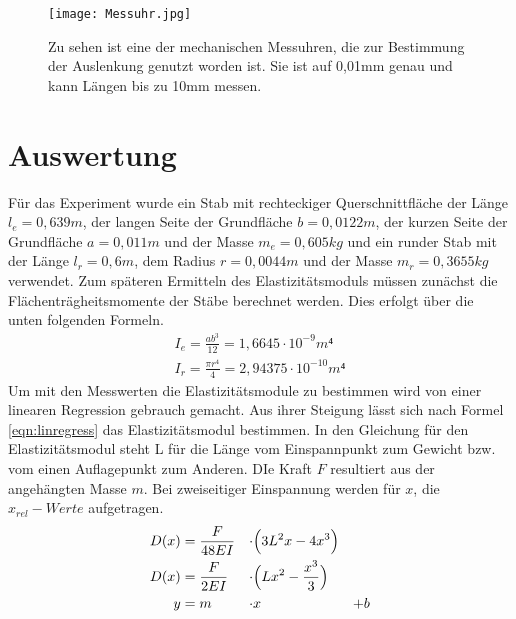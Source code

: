 \documentclass[titlepage = firstcover]{scrartcl}
\begin{document}
      \begin{figure}[h]
        \centering
        \texttt{[image: Messuhr.jpg]}
        \caption{Zu sehen ist eine der mechanischen Messuhren, die zur Bestimmung der Auslenkung genutzt worden ist. Sie ist auf 0,01mm genau und kann Längen bis zu 10mm messen.}
        \label{fig:fotoUhr}
      \end{figure}   
      
      \FloatBarrier

    \newpage

    \section{Auswertung}
      Für das Experiment wurde ein Stab mit rechteckiger Querschnittfläche der Länge $l_e = 0,639 m$, der langen Seite der Grundfläche $b = 0,0122 m$, der kurzen Seite der
      Grundfläche $a = 0,011 m$ und der Masse $m_e = 0,605 kg$ und ein runder Stab mit der Länge $l_r = 0,6 m$, dem Radius $r = 0,0044 m$ und der Masse $m_r = 0,3655 kg$ verwendet. Zum späteren 
      Ermitteln des Elastizitätsmoduls müssen zunächst die Flächenträgheitsmomente der Stäbe berechnet werden. Dies erfolgt über die unten folgenden Formeln.
      \begin{gather}
        I_e = \frac{ab^3}{12} = 1,6645 \cdot 10^{-9} m⁴\\
        I_r = \frac{\pi r^4}{4} = 2,94375 \cdot 10^{-10} m⁴
        \label{eqn:Flächenträg}
      \end{gather}
      Um mit den Messwerten die Elastizitätsmodule zu bestimmen wird von einer linearen Regression gebrauch gemacht. Aus ihrer Steigung lässt sich nach Formel
      \ref{eqn:linregress} das Elastizitätsmodul bestimmen. In den Gleichung für den Elastizitätsmodul steht L für die Länge vom
      Einspannpunkt zum Gewicht bzw. vom einen Auflagepunkt zum Anderen. DIe Kraft $F$ resultiert aus der angehängten Masse $m$.
      Bei zweiseitiger Einspannung werden für $x$, die $x_{rel}-Werte$ aufgetragen.
      \begin{align}
        D(x) &= \frac{F}{48EI} &\cdot &\Bigl(3L^2x - 4x^3\Bigr) & \\
        \label{eqn:linregresskomplett}
        D(x) &= \frac{F}{2EI} &\cdot &\Bigl(Lx^2 - \frac{x^3}{3}\Bigr) & \\
          y  &= m &\cdot &x &+ b
        \label{eqn:linregress}
      \end{align}
\end{document}
